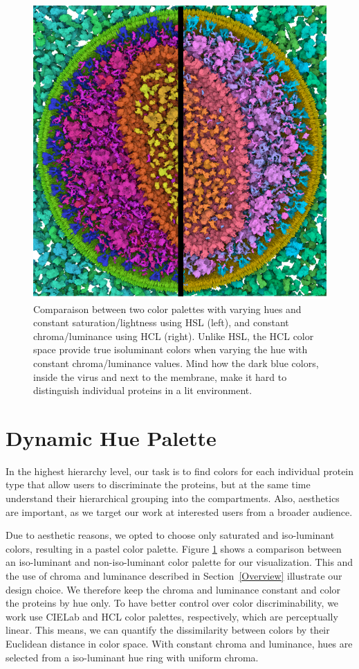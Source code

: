 \documentclass[review,journal]{vgtc}         %
\begin{document}
	
	\begin{figure}
		\centering
		\includegraphics[width=0.75\linewidth]{Figures/hslvshcl}
		\caption{Comparaison between two color palettes with varying hues and constant saturation/lightness using HSL (left), and constant chroma/luminance using HCL (right). 
		Unlike HSL, the HCL color space provide true isoluminant colors when varying the hue with constant chroma/luminance values.
		 Mind how the dark blue colors, inside the virus and next to the membrane, make it hard to distinguish individual proteins in a lit environment.}
		\label{fig:hslvshcl}
	\end{figure}
	
	
	
	\section{Dynamic Hue Palette}
	\label{sec:hue}
	
	In the highest hierarchy level, our task is to find colors for each individual protein type that allow users to discriminate the proteins, but at the same time understand their hierarchical grouping into the compartments. 
	Also, aesthetics are important, as we target our work at interested users from a broader audience. 
	
	Due to aesthetic reasons, we opted to choose only saturated and iso-luminant colors, resulting in a pastel color palette. 
	Figure \ref{fig:hslvshcl} shows a comparison between an iso-luminant and non-iso-luminant color palette for our visualization. This and the use of chroma and luminance described in Section~\ref{Overview} illustrate our design choice. 
	We therefore keep the chroma and luminance constant and color the proteins by hue only. 
	To have better control over color discriminability, we work use CIELab and HCL color palettes, respectively, which are perceptually linear. 
	This means, we can quantify the dissimilarity between colors by their Euclidean distance in color space. 
	With constant chroma and luminance, hues are selected from a iso-luminant hue ring with uniform chroma. 
	
\end{document}

